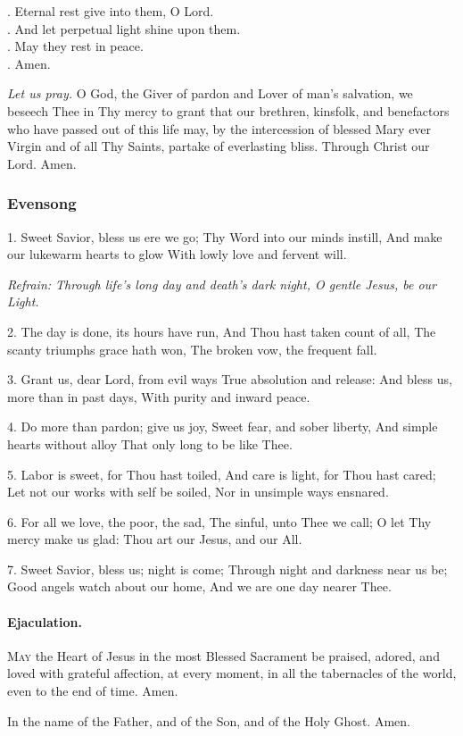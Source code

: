\documentclass{article}
\makeatletter
\DeclareRobustCommand{\versicle}{\textbf{\vers@resp{-0.1em}{V}}}
\DeclareRobustCommand{\response}{\textbf{\vers@resp{0pt}{R}}}
\newcommand{\vers@resp@sym}{\raisebox{0.2ex}{\rotatebox[origin=c]{-20}{$\m@th\rceil$}}}
\newcommand{\vers@resp}[2]{%
  {\ooalign{\hidewidth\kern#1\vers@resp@sym\hidewidth\cr#2\cr}}%
}
\makeatother
\begin{document}
\begin{multicols}{3}
\versicle. Eternal rest give into them, O Lord.\\
\response. And let perpetual light shine upon them.\\
\versicle. May they rest in peace.\\
\response. Amen.

\textit{Let us pray.}  O God, the Giver of pardon and Lover of man's salvation, we
beseech Thee in Thy mercy to grant that our brethren, kinsfolk, and benefactors who have
passed out of this life may, by the intercession of blessed Mary ever Virgin and of all Thy
Saints, partake of everlasting bliss.  Through Christ our Lord.  Amen.

\subsubsection*{Evensong}

1. Sweet Savior, bless us ere we go;
Thy Word into our minds instill,
And make our lukewarm hearts to glow
With lowly love and fervent will.

\textit{Refrain: Through life's long day and death's dark night, O gentle Jesus, be our Light.}

2. The day is done, its hours have run,
And Thou hast taken count of all,
The scanty triumphs grace hath won,
The broken vow, the frequent fall.

3. Grant us, dear Lord, from evil ways
True absolution and release:
And bless us, more than in past days,
With purity and inward peace.

4. Do more than pardon; give us joy,
Sweet fear, and sober liberty,
And simple hearts without alloy
That only long to be like Thee.

5. Labor is sweet, for Thou hast toiled,
And care is light, for Thou hast cared;
Let not our works with self be soiled,
Nor in unsimple ways ensnared.

6. For all we love, the poor, the sad,
The sinful, unto Thee we call;
O let Thy mercy make us glad:
Thou art our Jesus, and our All.

7. Sweet Savior, bless us; night is come;
Through night and darkness near us be;
Good angels watch about our home,
And we are one day nearer Thee.

\paragraph{Ejaculation.}
\textsc{May} the Heart of Jesus in the most Blessed Sacrament be praised, adored, and loved with
grateful affection, at every moment, in all the tabernacles of the world, even to the end of
time.  Amen.

In the name of the Father, and of the Son, and of the Holy Ghost.  Amen.

\end{multicols}
\end{document}
